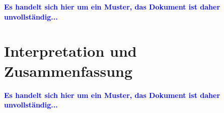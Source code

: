 \documentclass[parskip]{scrartcl}
\begin{document}
\textcolor{blue}{\textbf{Es handelt sich hier um ein Muster, das Dokument ist daher unvollständig...}}


\section{Interpretation und Zusammenfassung}

\textcolor{blue}{\textbf{Es handelt sich hier um ein Muster, das Dokument ist daher unvollständig...}}



\end{document}
